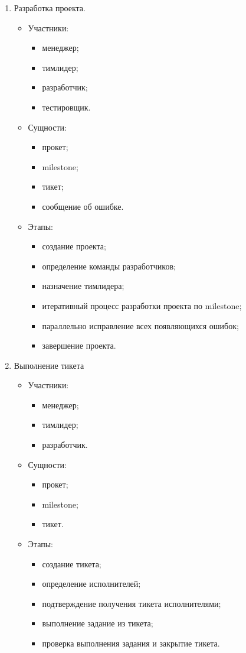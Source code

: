 \begin{enumerate}
\item Разработка проекта.
	\begin{itemize}
	\item Участники:
		\begin{itemize}
		\item менеджер;
		\item тимлидер;
		\item разработчик;
		\item тестировщик.
		\end{itemize}
	\item Сущности:
		\begin{itemize}
		\item прокет;
		\item milestone;
		\item тикет;
		\item сообщение об ошибке.
		\end{itemize}
	\item Этапы:
		\begin{itemize}
		\item создание проекта;
		\item определение команды разработчиков;
		\item назначение тимлидера;
		\item итеративный процесс разработки проекта по milestone;
		\item параллельно исправление всех появляющихся ошибок;
		\item завершение проекта.
		\end{itemize}
	\end{itemize}

\item Выполнение тикета
	\begin{itemize}
	\item Участники:
		\begin{itemize}
		\item менеджер;
		\item тимлидер;
		\item разработчик.
		\end{itemize}
	\item Сущности:
		\begin{itemize}
		\item прокет;
		\item milestone;
		\item тикет.
		\end{itemize}
	\item Этапы:
		\begin{itemize}
		\item создание тикета;
		\item определение исполнителей;
		\item подтверждение получения тикета исполнителями;
		\item выполнение задание из тикета;
		\item проверка выполнения задания и закрытие тикета.
		\end{itemize}
	\end{itemize}



\end{enumerate}
